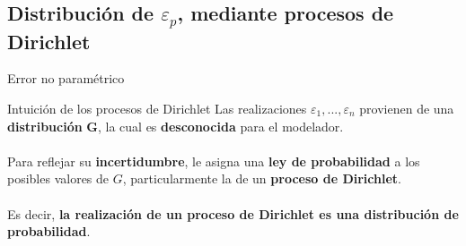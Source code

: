 \documentclass{beamer}
\begin{document}



\subsection{Distribuci\'on de $\varepsilon_p$, mediante procesos de Dirichlet}

\begin{frame}{Error no param\'etrico}
    \begin{block}{Intuici\'on de los procesos de Dirichlet}
        Las realizaciones $\varepsilon_1,...,\varepsilon_n$ provienen de una \textbf{distribuci\'on} $\bm G$, la cual es \textbf{desconocida} para el modelador. 
        \\~\\
        Para reflejar su \textbf{incertidumbre}, le asigna una \textbf{ley de probabilidad} a los posibles valores de $G$, particularmente la de un \textbf{proceso de Dirichlet}.
        \\~\\
        Es decir, \textbf{la realizaci\'on de un proceso de Dirichlet es una distribuci\'on de probabilidad}.
    \end{block}
\end{frame}
\end{document}
